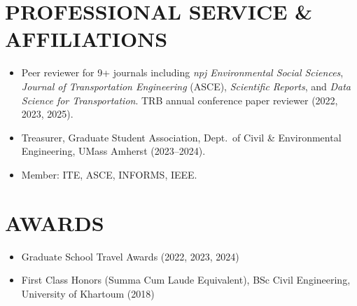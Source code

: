 \documentclass[10pt, a4paper]{article}
\begin{document}
\section{PROFESSIONAL SERVICE \& AFFILIATIONS}

\begin{itemize}
  \item Peer reviewer for 9+ journals including \textit{npj Environmental Social Sciences}, \textit{Journal of Transportation Engineering} (ASCE), \textit{Scientific Reports}, and \textit{Data Science for Transportation}. TRB annual conference paper reviewer (2022, 2023, 2025).
  \item Treasurer, Graduate Student Association, Dept.\ of Civil \& Environmental Engineering, UMass Amherst (2023--2024).
  \item Member: ITE, ASCE, INFORMS, IEEE.
\end{itemize}

\section{AWARDS}
\begin{itemize}
  \item Graduate School Travel Awards (2022, 2023, 2024)
  \item First Class Honors (Summa Cum Laude Equivalent), BSc Civil Engineering, University of Khartoum (2018)
\end{itemize}
\end{document}
